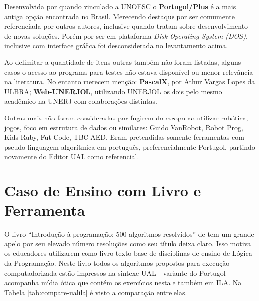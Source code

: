 Desenvolvida por  quando vinculado a UNOESC o \textbf{Portugol/Plus} é a mais antiga opção encontrada no Brasil. Merecendo destaque por ser comumente referenciada por outros autores, inclusive quando tratam sobre desenvolvimento de novas soluções. Porém por ser em plataforma \textit{Disk Operating System (DOS)}, inclusive com interface gráfica foi desconsiderada no levantamento acima.

Ao delimitar a quantidade de itens outras também não foram listadas, alguns casos o acesso ao programa para testes não estava disponível ou menor relevância na literatura. No entanto  merecem menção: \textbf{PascalX}, por Athur Vargas Lopes da ULBRA; \textbf{Web-UNERJOL}\nocite{ferrandin2005etal}, utilizando UNERJOL os dois pelo mesmo acadêmico na UNERJ com colaborações distintas.

Outras mais não foram consideradas por fugirem do escopo ao utilizar robótica, jogos, foco em estrutura de dados ou similares: Guido VanRobot, Robot Prog, Kids Ruby, Fut Code, TBC-AED. Eram pretendidas somente ferramentas com pseudo-linguagem algorítmica em português, preferencialmente Portugol, partindo novamente do Editor UAL como referencial.

\section{Caso de Ensino com Livro e Ferramenta}

O livro ``Introdução à programação: 500 algoritmos resolvidos'' de  tem um grande apelo por seu elevado número resoluções como seu título deixa claro. Isso motiva os educadores utilizarem como livro texto base de disciplinas de ensino de Lógica da Programação. Neste livro todos os algoritmos propostos para execução computadorizada estão impressos na sintexe UAL - variante do Portugol - acompanha mídia ótica que contém os exercícios nesta e também em ILA. Na Tabela \ref{tab:compare-ualila} é visto a comparação entre elas.

